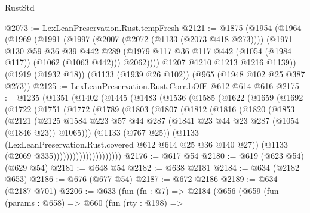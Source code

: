 \begin{lexlean}{RustStd}
\begin{coremodule}
{\begin{coremodule}
{{{{{{{{@2073 := LexLeanPreservation.Rust.tempFresh
@2121 := @1875
    (@1954
      (@1964
        (@1969
          (@1991
            (@1997
              (@2007 (@2072 (@1133 (@2073 @418 @273))))
              (@1971
                @130
                @59
                @36
                @39
                @442
                @289
                (@1979 @117 @36 @117 @442 (@1054 (@1984 @117)) (@1062 (@1063 @442)))
                @2062))))
        @1207
        @1210
        @1213
        @1216
        @1139))
    (@1919 (@1932 @18))
    (@1133 (@1939 @26 @102))
    (@965 (@1948 @102 @25 @387 @273))
@2125 := LexLeanPreservation.Rust.Corr.bOfE @612 @614 @616
@2175 := @1235
    (@1351
      (@1402
        (@1445
          (@1483
            (@1536
              (@1585
                (@1622
                  (@1659
                    (@1692
                      (@1722
                        (@1751
                          (@1772
                            (@1789
                              (@1803
                                (@1807
                                  (@1812
                                    (@1816
                                      (@1820
                                        (@1853
                                          (@2121
                                            (@2125
                                              @1584
                                              @223
                                              @57
                                              @44
                                              @287
                                              (@1841 @23 @44 @23 @287 (@1054 (@1846 @23)) @1065)))
                                          (@1133 (@767 @25))
                                          (@1133
                                            (LexLeanPreservation.Rust.covered
                                              @612
                                              @614
                                              @25
                                              @36
                                              @140
                                              @27))
                                          (@1133 (@2069 @335)))))))))))))))))))))
@2176 := @617 @54
@2180 := @619 (@623 @54) (@629 @54)
@2181 := @648 @54
@2182 := @638 @2181
@2184 := @634 (@2182 @653)
@2186 := @676 (@677 @54)
@2187 := @672 @2186
@2189 := @634 (@2187 @701)
@2206 := @633
    (fun (fn : @7) =>
    @2184
      (@656
        (@659
          (fun (params : @658) =>
          @660
            (fun (rty : @198) =>
}}}}}}}}
\end{coremodule}}
\end{coremodule}
\end{lexlean}
